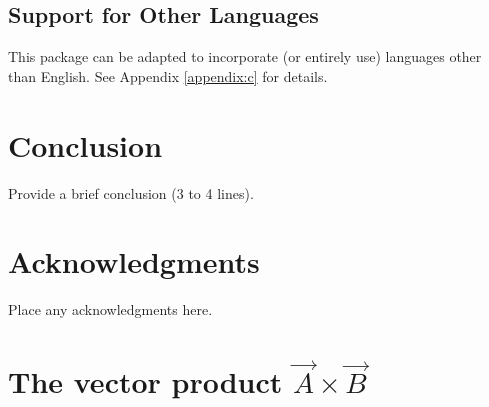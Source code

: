\documentclass[captionpatch,colorlinks,upint,subscriptcorrection,varvw,german]{asmeconf}
\begin{document}
\subsection{Support for Other Languages}  This package can be adapted to incorporate (or entirely use) languages other than English. See Appendix \ref{appendix:c} for details.



\section{Conclusion}
Provide a brief conclusion (3 to 4 lines).



\section*{Acknowledgments}
Place any acknowledgments here.



\nocite{*}%



\appendix


\section[The Vector Product A\times B]{The vector product $\vec{A}\times\vec{B}$}\label{appendix:a}
\end{document}
